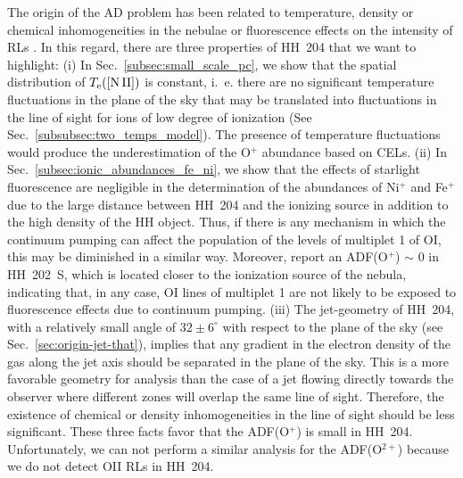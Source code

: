 \documentclass[twocolumn]{aastex63}
\newcommand{\jorge}[1]{{\color{magenta}J: #1}}
\begin{document}
The origin of the AD problem has been related to  temperature, density or chemical inhomogeneities in the nebulae or fluorescence effects on the intensity of RLs \citep[see ][and references therein]{Peimbert67, torrespeimbert80, liu01, Pequignot91, garciarojas07,Escalante12}  . In this regard, there are three properties of HH~204 that we want to highlight: (i) In Sec.~\ref{subsec:small_scale_pc}, we show that the spatial distribution of $T_{\rm e}(\text{[N\thinspace II]})$ is constant, i.~e. there are no significant temperature fluctuations in the plane of the sky that may be translated into fluctuations in the line of sight for ions of low degree of ionization (See Sec.~\ref{subsubsec:two_temps_model}). The presence of temperature fluctuations would produce the underestimation of the O$^+$ abundance based on CELs. (ii) In Sec.~\ref{subsec:ionic_abundances_fe_ni}, we show that the effects of starlight fluorescence are negligible in the determination of the abundances of Ni$^{+}$ and Fe$^{+}$ due to the large distance between HH~204 and the ionizing source in addition to the high density of the HH object. Thus, if there is any mechanism in which the continuum pumping can affect the population of the levels of multiplet 1 of O\thinspace I, this may be diminished in a similar way. Moreover, \citep[][]{mesadelgado09} report an ADF(O$^{+}$) $\sim$ 0 in HH~202~S, which is located closer to the ionization source of the nebula, indicating that, in any case, O\thinspace I lines of multiplet 1 are not likely to be exposed to fluorescence effects due to continuum pumping. (iii) The jet-geometry of HH~204, with a relatively small angle of $ 32 \pm 6 ^{\circ}$ with respect to the plane of the sky (see Sec.~\ref{sec:origin-jet-that}), implies that any gradient in the electron density of the gas along the jet axis should be separated in the plane of the sky. This is a more favorable geometry for analysis than the case of a jet flowing directly towards the observer where different zones will overlap the same line of sight. Therefore, the existence of chemical or density inhomogeneities in the line of sight should be less significant. These three facts favor that the ADF(O$^+$) is small in HH~204. Unfortunately, we can not perform a similar analysis for the ADF(O$^{2+}$) because we do not detect O\thinspace II RLs in HH~204. %
\end{document}
